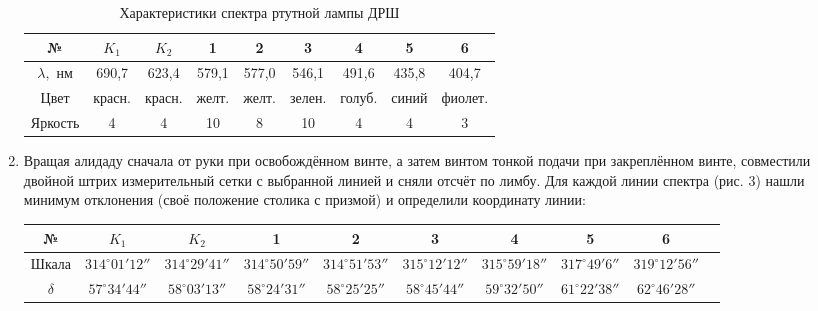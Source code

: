 \begin{enumerate}
	\begin{table}[h!]
		\centering
		\begin{tabular}{|c|c|c|c|c|c|c|c|c|}
			\hline
			№ & $K_1$ & $K_2$ & 1 & 2 & 3 & 4 & 5 & 6 \\ \hline
			$\lambda,$ нм & 690,7 & 623,4 & 579,1 & 577,0 & 546,1 & 491,6 & 435,8 & 404,7 \\ \hline
			Цвет &красн.&красн.& желт. & желт. & зелен. & голуб. & синий & фиолет. \\ \hline
			Яркость & 4 & 4&10 & 8 & 10 & 4 & 4 & 3 \\ \hline
		\end{tabular}
		\caption{Характеристики спектра ртутной лампы ДРШ}
		\label{tab:my-table}
	\end{table}
	\item Вращая алидаду сначала от руки при освобождённом винте, а затем винтом тонкой подачи при закреплённом винте, совместили двойной штрих измерительный сетки с выбранной линией и сняли отсчёт по лимбу. Для каждой линии спектра (рис. 3) нашли минимум отклонения (своё положение столика с призмой) и определили координату линии:
	\begin{center}
		\centering
		\begin{tabular}{|c|c|c|c|c|c|c|c|c|c|}
			\hline
			№ & $K_1$ & $K_2$ & 1 & 2 & 3 & 4 & 5 & 6  \\ \hline
			Шкала & $314^\circ01'12''$ & $314^\circ29'41''$ & $314^\circ50'59''$ & $314^\circ51'53''$ & $315^\circ12'12''$ & $315^\circ59'18''$ & $317^\circ49'6''$ & $319^\circ12'56''$ \\ \hline
			$\delta$ & $57^\circ34'44''$ & $58^\circ03'13''$ & $58^\circ24'31''$ & $58^\circ25'25''$ & $58^\circ45'44''$ & $59^\circ32'50''$ & $61^\circ22'38''$ & $62^\circ46'28''$ \\ \hline
		\end{tabular}
	\end{center}
	\end{enumerate}
